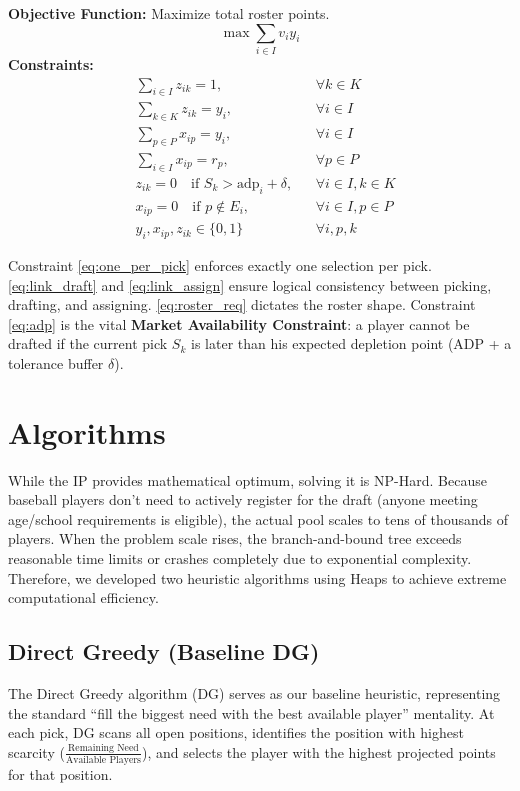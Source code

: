 \documentclass[11pt,a4paper]{article}
\begin{document}
\textbf{Objective Function:} Maximize total roster points.
\[
\max \sum_{i \in I} v_i y_i
\]
\begingroup
\setlength{\jot}{-0.1pt} %
\textbf{Constraints:}
\begin{align}
& \sum_{i \in I} z_{ik} = 1, && \forall k \in K \label{eq:one_per_pick} \\
& \sum_{k \in K} z_{ik} = y_i, && \forall i \in I \label{eq:link_draft} \\
& \sum_{p \in P} x_{ip} = y_i, && \forall i \in I \label{eq:link_assign} \\
& \sum_{i \in I} x_{ip} = r_p, && \forall p \in P \label{eq:roster_req} \\
& z_{ik} = 0 \quad \text{if } S_k > \text{adp}_i + \delta, && \forall i \in I, k \in K \label{eq:adp} \\
& x_{ip} = 0 \quad \text{if } p \not\in E_i, && \forall i \in I, p \in P\label{eq:Ei} \\
& y_i, x_{ip}, z_{ik} \in \{0,1\} && \forall i, p, k
\end{align}
\endgroup

Constraint \eqref{eq:one_per_pick} enforces exactly one selection per pick. \eqref{eq:link_draft} and \eqref{eq:link_assign} ensure logical consistency between picking, drafting, and assigning. \eqref{eq:roster_req} dictates the roster shape. Constraint \eqref{eq:adp} is the vital \textbf{Market Availability Constraint}: a player cannot be drafted if the current pick $S_k$ is later than his expected depletion point (ADP + a tolerance buffer $\delta$).

\section{Algorithms}

While the IP provides mathematical optimum, solving it is NP-Hard. 
Because baseball players don't need to actively register for the draft (anyone meeting age/school requirements is eligible), the actual pool scales to tens of thousands of players. When the problem scale rises, the branch-and-bound tree exceeds reasonable time limits or crashes completely due to exponential complexity.
Therefore, we developed two heuristic algorithms using Heaps to achieve extreme computational efficiency.

\subsection{Direct Greedy (Baseline DG)}
The Direct Greedy algorithm (DG) serves as our baseline heuristic,  representing the standard ``fill the biggest need with the best available player'' mentality. At each pick, DG scans all open positions, identifies the position with highest scarcity ($\frac{\text{Remaining Need}}{\text{Available Players}}$), and selects the player with the highest projected points for that position.
\end{document}
